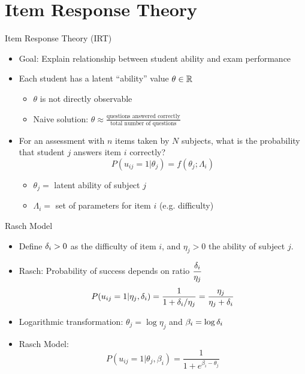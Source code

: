 \documentclass{beamer}
\def \R{\ensuremath \mathbb{R}}
\def \d{\ensuremath \delta}
\theoremstyle{definition}
\begin{document}
\section{Item Response Theory}

\begin{frame}{Item Response Theory (IRT)}
\begin{itemize}
  \item Goal: Explain relationship between student ability and exam performance
  \item Each student has a latent ``ability'' value $\theta \in \R$
  \begin{itemize}
    \item<2-> $\theta$ is not directly observable
    \item<2-> Naive solution: $\theta \approx \displaystyle\frac{\text{questions answered correctly}}{\text{total number of questions}}$
  \end{itemize}
  \item<3> For an assessment with $n$ items taken by $N$ subjects, what is the probability that student $j$ answers item $i$ correctly?
  \[P(u_{ij}=1 | \theta_j) = f(\theta_j; \Lambda_i)\]
  \begin{itemize}
    \item<3> $\theta_j =$ latent ability of subject $j$
    \item<3> $\Lambda_i =$ set of parameters for item $i$ (e.g. difficulty)
  \end{itemize}
\end{itemize}
\end{frame}

\begin{frame}{Rasch Model}
\begin{itemize}
  \item Define $\d_i > 0$ as the difficulty of item $i$, and $\eta_j > 0$ the ability of subject $j$.
  \item Rasch: Probability of success depends on ratio $\displaystyle \frac{\d_i}{\eta_j}$
    \[P(u_{ij} = 1 | \eta_j, \d_i) = \frac{1}{1 + \d_i/\eta_j} = \frac{\eta_j}{\eta_j + \d_i}\]
  \item<2-> Logarithmic transformation: $\theta_j = \log \eta_j$ and $\beta_i = \log \d_i$
  \item<2-> Rasch Model:
    \[P(u_{ij} = 1 | \theta_j, \beta_i) = \frac{1}{1 + e^{\beta_i - \theta_j}}\]
\end{itemize}
\end{frame}
\end{document}
